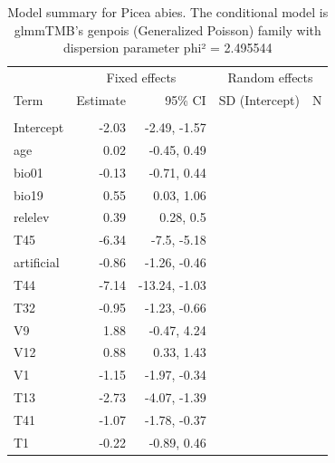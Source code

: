 \documentclass[
]{article}
\begin{document}
\begin{longtable}[t]{lrrrr}
\caption{\label{tab:summaries-tables}\label{tab:Pa}Model summary for Picea abies. The conditional model is glmmTMB's genpois (Generalized Poisson) family with dispersion parameter phi² = 2.495544}\\
\toprule
\multicolumn{1}{c}{ } & \multicolumn{2}{c}{Fixed effects} & \multicolumn{2}{c}{Random effects} \\
\cmidrule(l{3pt}r{3pt}){2-3} \cmidrule(l{3pt}r{3pt}){4-5}
Term & Estimate & 95\% CI & SD (Intercept) & N\\
\midrule
\addlinespace[0.3em]
\multicolumn{5}{l}{\textbf{Conditional model}}\\
\hspace{1em}Intercept & -2.03 & -2.49, -1.57 &  & \\
\hspace{1em}age & 0.02 & -0.45, 0.49 &  & \\
\hspace{1em}bio01 & -0.13 & -0.71, 0.44 &  & \\
\hspace{1em}bio19 & 0.55 & 0.03, 1.06 &  & \\
\hspace{1em}relelev & 0.39 & 0.28, 0.5 &  & \\
\hspace{1em}T45 & -6.34 & -7.5, -5.18 &  & \\
\hspace{1em}artificial & -0.86 & -1.26, -0.46 &  & \\
\hspace{1em}T44 & -7.14 & -13.24, -1.03 &  & \\
\hspace{1em}T32 & -0.95 & -1.23, -0.66 &  & \\
\hspace{1em}V9 & 1.88 & -0.47, 4.24 &  & \\
\hspace{1em}V12 & 0.88 & 0.33, 1.43 &  & \\
\hspace{1em}V1 & -1.15 & -1.97, -0.34 &  & \\
\hspace{1em}T13 & -2.73 & -4.07, -1.39 &  & \\
\hspace{1em}T41 & -1.07 & -1.78, -0.37 &  & \\
\hspace{1em}T1 & -0.22 & -0.89, 0.46 &  & \\

\end{longtable}
\end{document}
